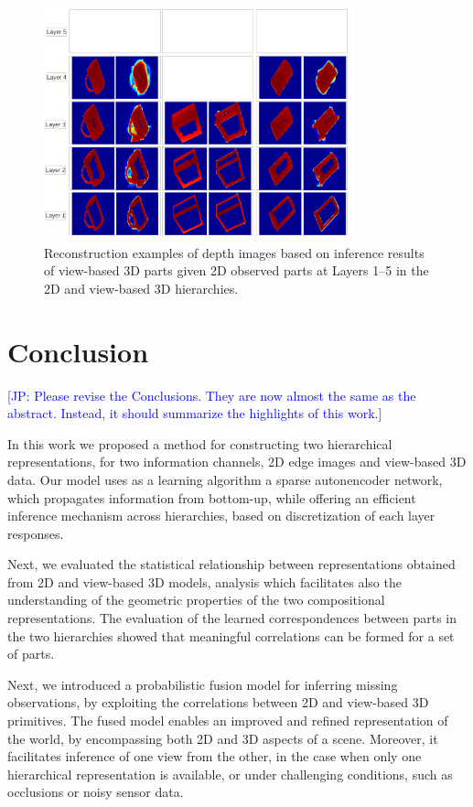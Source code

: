 \documentclass[runningheads]{llncs}
\newcommand{\commentJP}[1]{\textcolor{blue}{[JP: #1]}}
\begin{document}
\begin{figure}
\begin{center}
\includegraphics[width=0.8\textwidth]{inference}
\end{center}
\caption{Reconstruction examples of depth images based on inference results of view-based 3D parts given 2D observed parts at Layers 1--5 in the 2D and view-based 3D hierarchies.}
\label{inference}
\end{figure}

\section{Conclusion}
\label{sec:conclusions}

\commentJP{Please revise the Conclusions.  They are now almost the same as the abstract.  Instead, it should summarize the highlights of this work.}

In this work we proposed a method for constructing two hierarchical representations, for two information channels, 2D edge images and view-based 3D data. Our model uses as a learning algorithm a sparse autonencoder network, which propagates information from bottom-up, while offering an efficient inference mechanism across hierarchies, based on discretization of each layer responses. 

Next, we evaluated the statistical relationship between representations obtained from 2D and view-based 3D models, analysis which facilitates also the understanding of the geometric properties of the two compositional representations. The evaluation of the learned correspondences between parts in the two hierarchies showed that meaningful correlations can be formed for a set of parts. 

Next, we introduced a probabilistic fusion model for inferring missing observations, by exploiting the correlations between 2D and view-based 3D primitives. The fused model enables an improved and refined representation of the world, by encompassing both 2D and 3D aspects of a scene. Moreover, it facilitates inference of one view from the other, in the case when only one hierarchical representation is available, or under challenging conditions, such as occlusions or noisy sensor data. 



\end{document}
